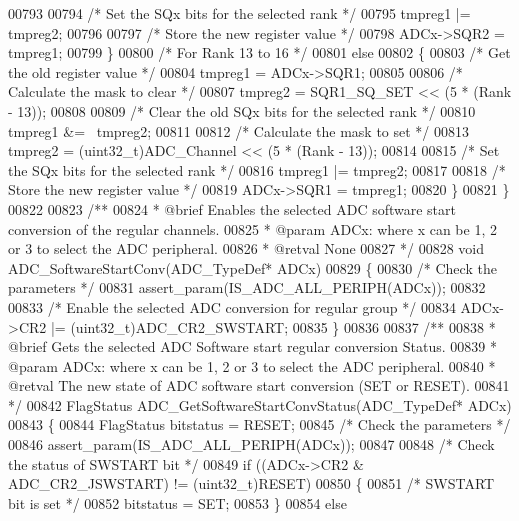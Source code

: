 \begin{DoxyCode}
00793 
00794     \textcolor{comment}{/* Set the SQx bits for the selected rank */}
00795     tmpreg1 |= tmpreg2;
00796 
00797     \textcolor{comment}{/* Store the new register value */}
00798     ADCx->SQR2 = tmpreg1;
00799   \}
00800   \textcolor{comment}{/* For Rank 13 to 16 */}
00801   \textcolor{keywordflow}{else}
00802   \{
00803     \textcolor{comment}{/* Get the old register value */}
00804     tmpreg1 = ADCx->SQR1;
00805 
00806     \textcolor{comment}{/* Calculate the mask to clear */}
00807     tmpreg2 = SQR1_SQ_SET << (5 * (Rank - 13));
00808 
00809     \textcolor{comment}{/* Clear the old SQx bits for the selected rank */}
00810     tmpreg1 &= ~tmpreg2;
00811 
00812     \textcolor{comment}{/* Calculate the mask to set */}
00813     tmpreg2 = (uint32\_t)ADC\_Channel << (5 * (Rank - 13));
00814 
00815     \textcolor{comment}{/* Set the SQx bits for the selected rank */}
00816     tmpreg1 |= tmpreg2;
00817 
00818     \textcolor{comment}{/* Store the new register value */}
00819     ADCx->SQR1 = tmpreg1;
00820   \}
00821 \}
00822 
00823 \textcolor{comment}{/**}
00824 \textcolor{comment}{  * @brief  Enables the selected ADC software start conversion of the regular channels.}
00825 \textcolor{comment}{  * @param  ADCx: where x can be 1, 2 or 3 to select the ADC peripheral.}
00826 \textcolor{comment}{  * @retval None}
00827 \textcolor{comment}{  */}
00828 \textcolor{keywordtype}{void} ADC_SoftwareStartConv(ADC\_TypeDef* ADCx)
00829 \{
00830   \textcolor{comment}{/* Check the parameters */}
00831   assert_param(IS\_ADC\_ALL\_PERIPH(ADCx));
00832 
00833   \textcolor{comment}{/* Enable the selected ADC conversion for regular group */}
00834   ADCx->CR2 |= (uint32\_t)ADC_CR2_SWSTART;
00835 \}
00836 
00837 \textcolor{comment}{/**}
00838 \textcolor{comment}{  * @brief  Gets the selected ADC Software start regular conversion Status.}
00839 \textcolor{comment}{  * @param  ADCx: where x can be 1, 2 or 3 to select the ADC peripheral.}
00840 \textcolor{comment}{  * @retval The new state of ADC software start conversion (SET or RESET).}
00841 \textcolor{comment}{  */}
00842 FlagStatus ADC_GetSoftwareStartConvStatus(ADC\_TypeDef* ADCx)
00843 \{
00844   FlagStatus bitstatus = RESET;
00845   \textcolor{comment}{/* Check the parameters */}
00846   assert_param(IS\_ADC\_ALL\_PERIPH(ADCx));
00847 
00848   \textcolor{comment}{/* Check the status of SWSTART bit */}
00849   \textcolor{keywordflow}{if} ((ADCx->CR2 & ADC_CR2_JSWSTART) != (uint32\_t)RESET)
00850   \{
00851     \textcolor{comment}{/* SWSTART bit is set */}
00852     bitstatus = SET;
00853   \}
00854   \textcolor{keywordflow}{else}

\end{DoxyCode}
